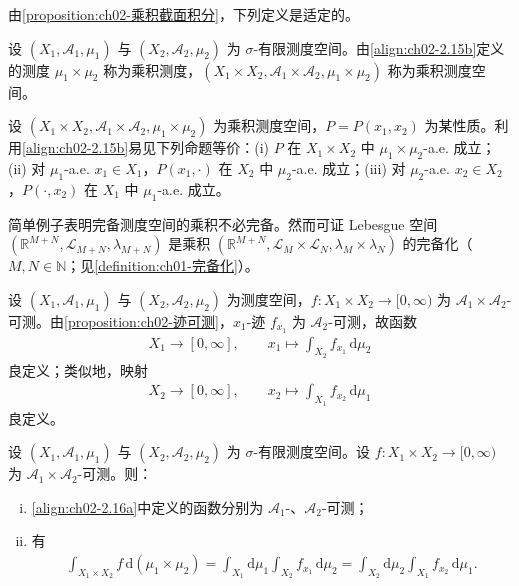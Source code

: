 \documentclass[../../main.tex]{subfiles}%
\begin{document}
由\cref{proposition:ch02-乘积截面积分}，下列定义是适定的。

\begin{definition}\label{definition:ch02-乘积测度}
设 $(X_1,\mathscr A_1,\mu_1)$ 与 $(X_2,\mathscr A_2,\mu_2)$ 为 $\sigma$-有限测度空间。由\eqref{align:ch02-2.15b}定义的测度 $\mu_1\times\mu_2$ 称为乘积测度，$(X_1\times X_2,\mathscr A_1\times\mathscr A_2,\mu_1\times\mu_2)$ 称为乘积测度空间。
\end{definition}

\begin{remark}\label{remark:ch02-乘积a.e.等价}
设 $(X_1\times X_2,\mathscr A_1\times\mathscr A_2,\mu_1\times\mu_2)$ 为乘积测度空间，$P=P(x_1,x_2)$ 为某性质。利用\eqref{align:ch02-2.15b}易见下列命题等价：(i) $P$ 在 $X_1\times X_2$ 中 $\mu_1\times\mu_2$-a.e. 成立；(ii) 对 $\mu_1$-a.e. $x_1\in X_1$，$P(x_1,\cdot)$ 在 $X_2$ 中 $\mu_2$-a.e. 成立；(iii) 对 $\mu_2$-a.e. $x_2\in X_2$，$P(\cdot,x_2)$ 在 $X_1$ 中 $\mu_1$-a.e. 成立。
\end{remark}

\begin{remark}\label{remark:ch02-乘积完备化}\label{proposition:ch02-完备化}
简单例子表明完备测度空间的乘积不必完备。然而可证 Lebesgue 空间 $(\mathbb R^{M+N},\mathscr L_{M+N},\lambda_{M+N})$ 是乘积 $(\mathbb R^{M+N},\mathscr L_M\times\mathscr L_N,\lambda_M\times\lambda_N)$ 的完备化（$M,N\in\mathbb N$；见\cref{definition:ch01-完备化}）。
\end{remark}

设 $(X_1,\mathscr A_1,\mu_1)$ 与 $(X_2,\mathscr A_2,\mu_2)$ 为测度空间，$f:X_1\times X_2\to[0,\infty)$ 为 $\mathscr A_1\times\mathscr A_2$-可测。由\cref{proposition:ch02-迹可测}，$x_1$-迹 $f_{x_1}$ 为 $\mathscr A_2$-可测，故函数
\begin{align}
X_1\to[0,\infty],\qquad x_1\mapsto\int_{X_2}f_{x_1}\,\mathrm{d}\mu_2 \label{align:ch02-2.16a}
\end{align}
良定义；类似地，映射
\begin{align}
X_2\to[0,\infty],\qquad x_2\mapsto\int_{X_1}f_{x_2}\,\mathrm{d}\mu_1 \label{align:ch02-2.16b}
\end{align}
良定义。

\begin{theorem}[Tonelli]\label{theorem:ch02-Tonelli}
设 $(X_1,\mathscr A_1,\mu_1)$ 与 $(X_2,\mathscr A_2,\mu_2)$ 为 $\sigma$-有限测度空间。设 $f:X_1\times X_2\to[0,\infty)$ 为 $\mathscr A_1\times\mathscr A_2$-可测。则：
\begin{enumerate}[(i)]
\item \eqref{align:ch02-2.16a}中定义的函数分别为 $\mathscr A_1$-、$\mathscr A_2$-可测；
\item 有
\begin{align}
\int_{X_1\times X_2}f\,\mathrm{d}(\mu_1\times\mu_2)
=\int_{X_1}\mathrm{d}\mu_1\int_{X_2}f_{x_1}\,\mathrm{d}\mu_2
=\int_{X_2}\mathrm{d}\mu_2\int_{X_1}f_{x_2}\,\mathrm{d}\mu_1. \label{align:ch02-2.17}
\end{align}
\end{enumerate}
\end{theorem}
\end{document}
